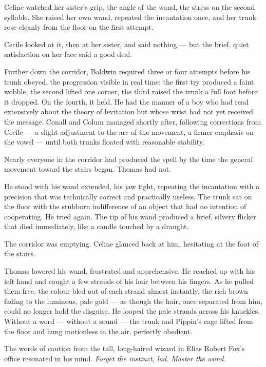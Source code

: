 Celine watched her sister's grip, the angle of the wand, the stress on the second syllable. She raised her own wand, repeated the incantation once, and her trunk rose cleanly from the floor on the first attempt.

Cecile looked at it, then at her sister, and said nothing --- but the brief, quiet satisfaction on her face said a good deal.

Further down the corridor, Baldwin required three or four attempts before his trunk obeyed, the progression visible in real time: the first try produced a faint wobble, the second lifted one corner, the third raised the trunk a full foot before it dropped. On the fourth, it held. He had the manner of a boy who had read extensively about the theory of levitation but whose wrist had not yet received the message. Conall and Colum managed shortly after, following corrections from Cecile --- a slight adjustment to the arc of the movement, a firmer emphasis on the vowel --- until both trunks floated with reasonable stability.

Nearly everyone in the corridor had produced the spell by the time the general movement toward the stairs began. Thomas had not.

He stood with his wand extended, his jaw tight, repeating the incantation with a precision that was technically correct and practically useless. The trunk sat on the floor with the stubborn indifference of an object that had no intention of cooperating. He tried again. The tip of his wand produced a brief, silvery flicker that died immediately, like a candle touched by a draught.

The corridor was emptying. Celine glanced back at him, hesitating at the foot of the stairs.

Thomas lowered his wand, frustrated and apprehensive. He reached up with his left hand and caught a few strands of his hair between his fingers. As he pulled them free, the colour bled out of each strand almost instantly, the rich brown fading to the luminous, pale gold --- as though the hair, once separated from him, could no longer hold the disguise. He looped the pale strands across his knuckles. Without a word --- without a sound --- the trunk and Pippin's cage lifted from the floor and hung motionless in the air, perfectly obedient.

The words of caution from the tall, long-haired wizard in Elias Robert Fox's office resonated in his mind. \textit{Forget the instinct, lad. Master the wand.}

